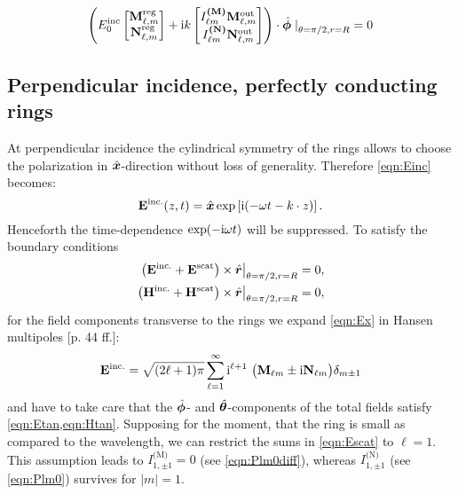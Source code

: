 \begin{align}
\left(
E_0^\text{inc}\left[
\begin{matrix}
\mathbf{M}_{\ell,m}^\text{reg} \\
\mathbf{N}_{\ell,m}^\text{reg}
\end{matrix}\right]
+
\mathrm{i} k \left[\begin{matrix}
I_{\ell m}^\textbf{(M)}\mathbf{M}_{\ell,m}^\text{out} \\
I_{\ell m}^\textbf{(N)}\mathbf{N}_{\ell,m}^\text{out}
\end{matrix}\right]\right) \cdot 
\hat{\bm{\phi}}\left.\right\vert_{\theta=\pi/2,r=R} = 0
\end{align}

\subsection{Perpendicular incidence, perfectly conducting rings}
At perpendicular incidence the cylindrical symmetry of the rings allows to choose the polarization in $\hat{\bm{x}}$-direction without loss of generality. Therefore \cref{eqn:Einc} becomes:
\begin{equation}
\mathbf{E}^\text{inc.} (z, t)= \hat{\bm{x}} \exp\left[\mathrm{i} (-\omega t- k\cdot z)\right].
\label{eqn:Ex}
\end{equation}
Henceforth the time-dependence $\exp(-\mathrm{i} \omega t)$ will be suppressed. To satisfy the boundary conditions
\begin{align}
\left.\left(\mathbf{E}^\text{inc.}+\mathbf{E}^\text{scat}\right)\times \hat{\bm{r}}\right\vert_{\theta=\pi/2, r=R} = 0,
\label{eqn:Etan}\\
\left.\left(\mathbf{H}^\text{inc.}+\mathbf{H}^\text{scat}\right)\times \hat{\bm{r}}\right\vert_{\theta=\pi/2, r=R} = 0,
\label{eqn:Htan}
\end{align}
for the field components transverse to the rings we expand \cref{eqn:Ex} in Hansen multipoles \cite{Kristensson2014}[p. 44 ff.]:
\begin{equation}
\mathbf{E}^\text{inc.} = \sqrt{(2\ell+1)\pi}\sum_{\ell=1}^\infty \imag^{\ell+1}\ 
\big( \mathbf{M}_{\ell m} \pm \imag \mathbf{N}_{\ell m}\big) \delta_{m \pm 1}
\label{eqn:Einc}
\end{equation}
and have to take care that the $\hat{\bm{\phi}}$- and $\hat{\bm{\theta}}$-components of the total fields satisfy \cref{eqn:Etan,eqn:Htan}. Supposing for the moment, that the ring is small as compared to the wavelength, we can restrict the sums in \cref{eqn:Escat} to $\ell=1$. This assumption leads to  $I^\text{(M)}_{1,\pm 1}=0$ (see \cref{eqn:Plm0diff}), whereas $I^\text{(N)}_{1,\pm 1}$ (see \cref{eqn:Plm0}) survives for $|m|=1$.

